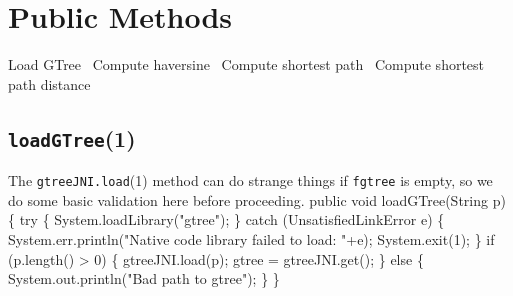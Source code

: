 \documentclass{article}
\def\nwendcode{\endtrivlist \endgroup}      %
\let\nwdocspar=\par
\begin{document}
\section{Public Methods}
\nwenddocs{}\endmoddef{}
  \LA{}Load GTree~{\nwtagstyle{}}\RA{}
  \LA{}Compute haversine~{\nwtagstyle{}}\RA{}
  \LA{}Compute shortest path~{\nwtagstyle{}}\RA{}
  \LA{}Compute shortest path distance~{\nwtagstyle{}}\RA{}
\nwendcode{}\nwdocspar

\subsection{{\tt{}\protect{}\protect{}loadGTree}(1)}
The {\tt{}gtreeJNI.load}(1) method can do strange things if {\tt{}f{}gtree} is empty,
so we do some basic validation here before proceeding.
\nwenddocs{}\endmoddef{}
public void loadGTree(String p) \{
  try \{
    System.loadLibrary("gtree");
  \} catch (UnsatisfiedLinkError e) \{
    System.err.println("Native code library failed to load: "+e);
    System.exit(1);
  \}
  if (p.length() > 0) \{
    gtreeJNI.load(p);
    gtree = gtreeJNI.get();
  \} else \{
    System.out.println("Bad path to gtree");
  \}
\}
\eatline
{}\nwendcode{}\nwdocspar
\end{document}
